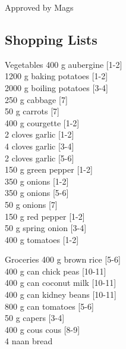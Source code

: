\begin{menu}{Approved by Mags}
    \subsection*{Shopping Lists}
      \begin{shoppinglist}{Vegetables}
      400 g aubergine 
        {\scriptsize[1-2]}\\
      1200 g baking potatoes 
        {\scriptsize[1-2]}\\
      2000 g boiling potatoes 
        {\scriptsize[3-4]}\\
      250 g cabbage 
        {\scriptsize[7]}\\
      50 g carrots 
        {\scriptsize[7]}\\
      400 g courgette 
        {\scriptsize[1-2]}\\
      2 cloves garlic 
        {\scriptsize[1-2]}\\
      4 cloves garlic 
        {\scriptsize[3-4]}\\
      2 cloves garlic 
        {\scriptsize[5-6]}\\
      150 g green pepper 
        {\scriptsize[1-2]}\\
      350 g onions 
        {\scriptsize[1-2]}\\
      350 g onions 
        {\scriptsize[5-6]}\\
      50 g onions 
        {\scriptsize[7]}\\
      150 g red pepper 
        {\scriptsize[1-2]}\\
      50 g spring onion 
        {\scriptsize[3-4]}\\
      400 g tomatoes 
        {\scriptsize[1-2]}\\
      \end{shoppinglist}%
      \begin{shoppinglist}{Groceries}
      400 g brown rice 
        {\scriptsize[5-6]}\\
      400 g can chick peas 
        {\scriptsize[10-11]}\\
      400 g can coconut milk 
        {\scriptsize[10-11]}\\
      400 g can kidney beans 
        {\scriptsize[10-11]}\\
      800 g can tomatoes 
        {\scriptsize[5-6]}\\
      50 g capers 
        {\scriptsize[3-4]}\\
      400 g cous cous 
        {\scriptsize[8-9]}\\
      4  naan bread 

\end{shoppinglist}
\end{menu}
